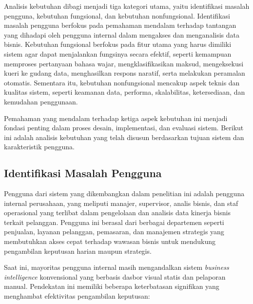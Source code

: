 Analisis kebutuhan dibagi menjadi tiga kategori utama, yaitu identifikasi masalah pengguna, kebutuhan fungsional, dan kebutuhan nonfungsional. Identifikasi masalah pengguna berfokus pada pemahaman mendalam terhadap tantangan yang dihadapi oleh pengguna internal dalam mengakses dan menganalisis data bisnis. Kebutuhan fungsional berfokus pada fitur utama yang harus dimiliki sistem agar dapat menjalankan fungsinya secara efektif, seperti kemampuan memproses pertanyaan bahasa wajar, mengklasifikasikan maksud, mengeksekusi kueri ke gudang data, menghasilkan respons naratif, serta melakukan peramalan otomatis. Sementara itu, kebutuhan nonfungsional mencakup aspek teknis dan kualitas sistem, seperti keamanan data, performa, skalabilitas, ketersediaan, dan kemudahan penggunaan.

Pemahaman yang mendalam terhadap ketiga aspek kebutuhan ini menjadi fondasi penting dalam proses desain, implementasi, dan evaluasi sistem. Berikut ini adalah analisis kebutuhan yang telah disusun berdasarkan tujuan sistem dan karakteristik pengguna.

\subsection{Identifikasi Masalah Pengguna}

Pengguna dari sistem yang dikembangkan dalam penelitian ini adalah pengguna internal perusahaan, yang meliputi manajer, supervisor, analis bisnis, dan staf operasional yang terlibat dalam pengelolaan dan analisis data kinerja bisnis terkait pelanggan. Pengguna ini berasal dari berbagai departemen seperti penjualan, layanan pelanggan, pemasaran, dan manajemen strategis yang membutuhkan akses cepat terhadap wawasan bisnis untuk mendukung pengambilan keputusan harian maupun strategis.

Saat ini, mayoritas pengguna internal masih mengandalkan sistem \textit{business intelligence} konvensional yang berbasis dasbor visual statis dan pelaporan manual. Pendekatan ini memiliki beberapa keterbatasan signifikan yang menghambat efektivitas pengambilan keputusan:

